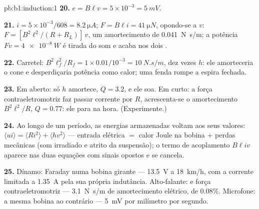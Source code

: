 \begin{solution}{pb:b1:induction:1}
\textbf{20.} $e = B\ell v = 5 \times 10^{-3} = \qty{5}{mV}$.

\textbf{21.} $i = 5 \times 10^{-3}/608 = \qty{8.2}{\micro A}$; $F = B\ell i = \qty{41}{\micro N}$,
opondo-se a $v$: $F = [B^2\ell^2/(R + R_L)]\,v$, um amortecimento de \qty{0.041}{N.s/m};
a potência $Fv = \qty{4e-8}{W}$ é tirada do som e acaba nos
dois .

\textbf{22.} Carretel: $B^2\ell_f^2/R_f = 1 \times 0.01/10^{-3} = \qty{10}{N.s/m}$, dez
vezes $h$: ele amorteceria o cone e desperdiçaria potência como calor; uma fenda
rompe a espira fechada.

\textbf{23.} Em aberto: só $h$ amortece, $Q = 3.2$, e ele soa. Em curto: a
força contraeletromotriz faz passar corrente por $R$, acrescenta-se o amortecimento $B^2\ell^2/R$,
$Q = 0.77$: ele para na hora. (Experimente.)

\textbf{24.} Ao longo de um período, as energias armazenadas voltam aos seus valores:
$\langle ui\rangle = \langle Ri^2\rangle + \langle hv^2\rangle$ --- entrada elétrica $=$
calor Joule na bobina $+$ perdas mecânicas (som irradiado e
atrito da suspensão); o termo de acoplamento $B\ell iv$ aparece nas duas
equações com sinais opostos e se cancela.

\textbf{25.} Dínamo: Faraday numa bobina girante --- \qty{13.5}{V} a
\qty{18}{km/h}, com a corrente limitada a \qty{1.35}{A} pela sua própria indutância.
Alto-falante:  e força contraeletromotriz --- \qty{3.1}{N.s/m} de amortecimento
elétrico,  de $0.08\%$. Microfone: a mesma bobina ao contrário ---
\qty{5}{mV} por milímetro por segundo.
\end{solution}
